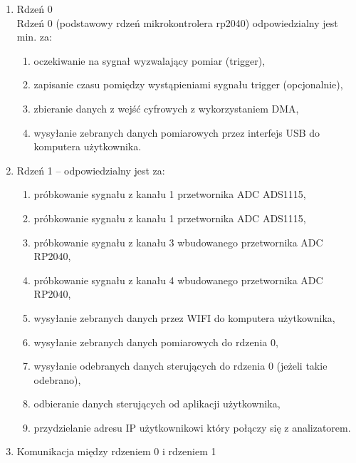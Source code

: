 \begin{enumerate}
    \item Rdzeń 0\\
    Rdzeń 0 (podstawowy rdzeń mikrokontrolera rp2040) odpowiedzialny jest min. za:
    \begin{enumerate}[label=\arabic*.]
        \item oczekiwanie na sygnał wyzwalający pomiar (trigger),
        \item zapisanie czasu pomiędzy wystąpieniami sygnału trigger (opcjonalnie),
        \item zbieranie danych z wejść cyfrowych z wykorzystaniem DMA,
        \item wysyłanie zebranych danych pomiarowych przez interfejs USB do komputera użytkownika.
    \end{enumerate}

    \item Rdzeń 1 -- odpowiedzialny jest za:
    \begin{enumerate}[label=\arabic*.]
        \item próbkowanie sygnału z kanału 1 przetwornika ADC ADS1115,
        \item próbkowanie sygnału z kanału 1 przetwornika ADC ADS1115,
        \item próbkowanie sygnału z kanału 3 wbudowanego przetwornika ADC RP2040,
        \item próbkowanie sygnału z kanału 4 wbudowanego przetwornika ADC RP2040,
        \item wysyłanie zebranych danych przez WIFI do komputera użytkownika,
        \item wysyłanie zebranych danych pomiarowych do rdzenia 0,
        \item wysyłanie odebranych danych sterujących do rdzenia 0 (jeżeli takie odebrano),
        \item odbieranie danych sterujących od aplikacji użytkownika,
        \item przydzielanie adresu IP użytkownikowi który połączy się z analizatorem.
    \end{enumerate}

    \newpage
    \item Komunikacja między rdzeniem 0 i rdzeniem 1
    \begin{figure}[H]
    \centering
    \begin{tikzpicture}[
        corebox/.style={
            rectangle,
            draw=blue!55,
            line width=1mm,
            fill=blue!20,
            rounded corners,
            minimum width=7cm,
            minimum height=10cm,
            align=left,
            text width=6cm,
            font=\bfseries
        },
        arrow/.style={
            <->,
            ultra thick,
            draw=blue!70
        }
    ]


\end{tikzpicture}
\end{figure}
\end{enumerate}
